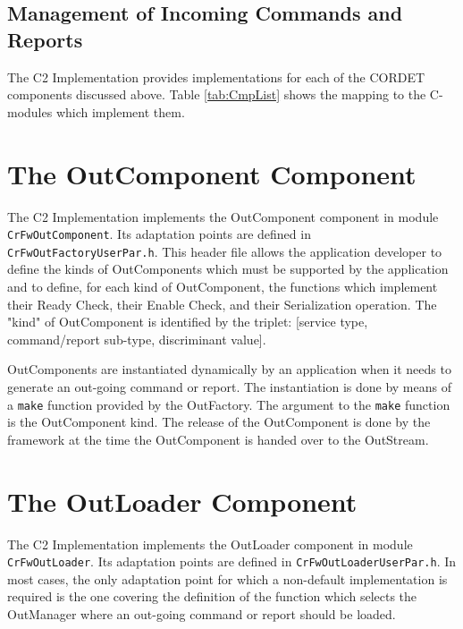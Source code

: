 \documentclass{pnp_article}
\begin{document}
\subsection{Management of Incoming Commands and Reports}\label{sec:ManagementOfIncomingCmdAndRep}


The C2 Implementation provides implementations for each of the CORDET components discussed above. Table \ref{tab:CmpList} shows the mapping to the C-modules which implement them.


\section{The OutComponent Component}\label{sec:OutComponent}
 

The C2 Implementation implements the OutComponent component in module \texttt{CrFwOutComponent}. Its adaptation points are defined in \texttt{CrFwOutFactoryUserPar.h}. This header file allows the application developer to define the kinds of OutComponents which must be supported by the application and to define, for each kind of OutComponent, the functions which implement their Ready Check, their Enable Check, and their Serialization operation. The "kind" of OutComponent is identified by the triplet: [service type, command/report sub-type, discriminant value]. 

OutComponents are instantiated dynamically by an application when it needs to generate an out-going command or report. The instantiation is done by means of a \texttt{make} function provided by the OutFactory. The argument to the \texttt{make} function is the OutComponent kind. The release of the OutComponent is done by the framework at the time the OutComponent is handed over to the OutStream.

\section{The OutLoader Component}\label{sec:OutLoader}


The C2 Implementation implements the OutLoader component in module \texttt{CrFwOutLoader}. Its adaptation points are defined in \texttt{CrFwOutLoaderUserPar.h}. In most cases, the only adaptation point for which a non-default implementation is required is the one covering the definition of the function which selects the OutManager where an out-going command or report should be loaded. 
\end{document}
